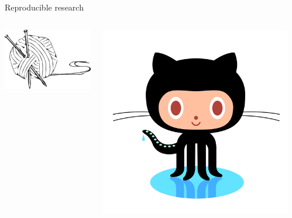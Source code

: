 \documentclass[serif]{beamer}\usepackage[]{graphicx}\usepackage[]{color}
\begin{document}
\begin{frame}{Reproducible research}
\begin{columns}
\begin{column}{0.2\textwidth}
\centerline{\includegraphics[width = \textwidth]{fig/knit-logo.png}}
\end{column}
\begin{column}{0.2\textwidth}
\centerline{\includegraphics[width = \textwidth]{fig/octocat.png}}
\end{column}
\begin{column}{0.2\textwidth}

\end{column}
\end{columns}
\end{frame}
\end{document}
